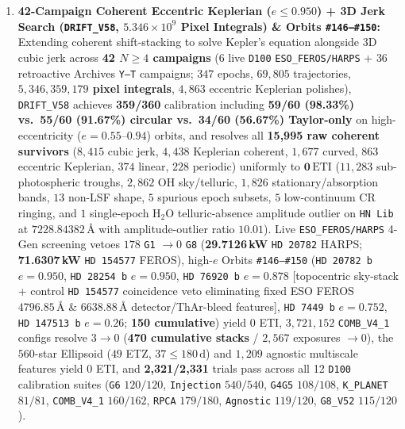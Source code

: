 \documentclass[twocolumn,10pt]{article}
\begin{document}
\begin{enumerate}
  \item \textbf{42-Campaign Coherent Eccentric Keplerian ($e \le 0.950$) + 3D Jerk Search (\texttt{DRIFT\_V58}, $5.346\times 10^9$ Pixel Integrals) \& Orbits \texttt{\#146--\#150}:} Extending coherent shift-stacking to solve Kepler's equation alongside 3D cubic jerk across \textbf{42 $N\ge 4$ campaigns} ($6$ live \texttt{D100} \texttt{ESO\_FEROS/HARPS} + $36$ retroactive Archives \texttt{Y--T} campaigns; $347$ epochs, $69{,}805$ trajectories, \textbf{$5{,}346{,}359{,}179$ pixel integrals}, $4{,}863$ eccentric Keplerian polishes), \texttt{DRIFT\_V58} achieves \textbf{359/360} calibration including \textbf{59/60 (98.33\%) vs.\ 55/60 (91.67\%) circular vs.\ 34/60 (56.67\%) Taylor-only} on high-eccentricity ($e=0.55\text{--}0.94$) orbits, and resolves all \textbf{15,995 raw coherent survivors} ($8{,}415$ cubic jerk, $4{,}438$ Keplerian coherent, $1{,}677$ curved, $863$ eccentric Keplerian, $374$ linear, $228$ periodic) uniformly to $\mathbf{0\,\mathrm{ETI}}$ ($11{,}283$ sub-photospheric troughs, $2{,}862$ OH sky/telluric, $1{,}826$ stationary/absorption bands, $13$ non-LSF shape, $5$ spurious epoch subsets, $5$ low-continuum CR ringing, and $1$ single-epoch $\mathrm{H_2O}$ telluric-absence amplitude outlier on \texttt{HN\,Lib} at $7228.84382\,\text{\AA}$ with amplitude-outlier ratio $10.01$). Live \texttt{ESO\_FEROS/HARPS} 4-Gen screening vetoes $178$ \texttt{G1} $\rightarrow 0$ \texttt{G8} (\textbf{29.7126\,kW} \texttt{HD\,20782} HARPS; \textbf{71.6307\,kW} \texttt{HD\,154577} FEROS), high-$e$ Orbits \texttt{\#146--\#150} (\texttt{HD\,20782\,b} $e=0.950$, \texttt{HD\,28254\,b} $e=0.950$, \texttt{HD\,76920\,b} $e=0.878$ [topocentric sky-stack + control \texttt{HD\,154577} coincidence veto eliminating fixed ESO FEROS $4796.85\,\text{\AA}$ \& $6638.88\,\text{\AA}$ detector/ThAr-bleed features], \texttt{HD\,7449\,b} $e=0.752$, \texttt{HD\,147513\,b} $e=0.26$; \textbf{150 cumulative}) yield $0$ ETI, $3{,}721{,}152$ \texttt{COMB\_V4\_1} configs resolve $3 \rightarrow 0$ (\textbf{470 cumulative stacks} / $2{,}567$ exposures $\rightarrow 0$), the $560$-star Ellipsoid ($49$ ETZ, $37 \le 180\,\text{d}$) and $1{,}209$ agnostic multiscale features yield $0$ ETI, and \textbf{2,321/2,331} trials pass across all 12 \texttt{D100} calibration suites (\texttt{G6} $120/120$, \texttt{Injection} $540/540$, \texttt{G4G5} $108/108$, \texttt{K\_PLANET} $81/81$, \texttt{COMB\_V4\_1} $160/162$, \texttt{RPCA} $179/180$, \texttt{Agnostic} $119/120$, \texttt{G8\_V52} $115/120$).
\end{enumerate}
\end{document}
